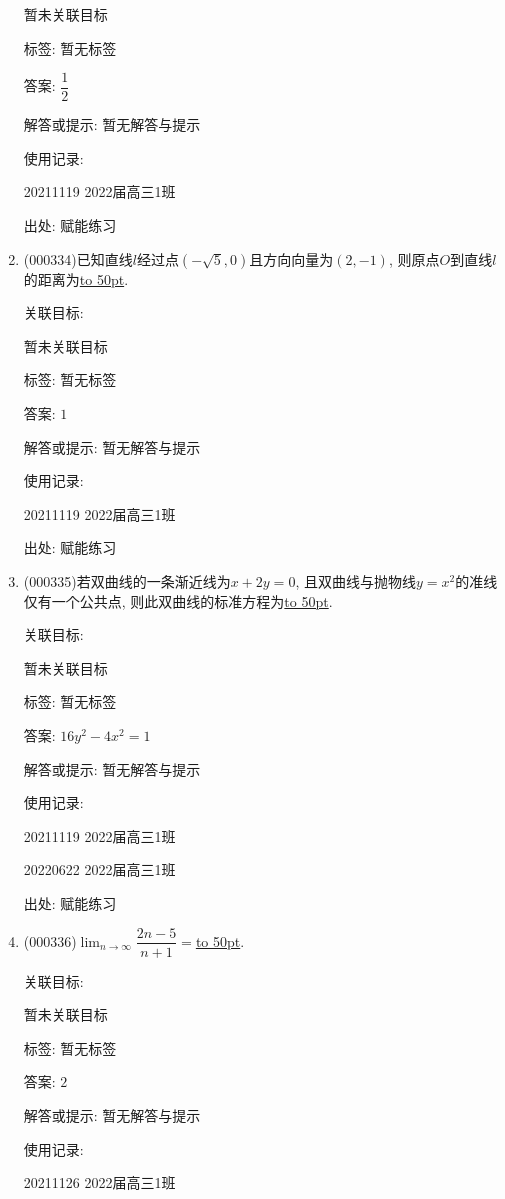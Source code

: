 \documentclass[10pt,a4paper]{article}
\newcommand{\blank}[1]{\underline{\hbox to #1pt{}}}
\begin{document}
\begin{enumerate}[1.]
暂未关联目标



标签: 暂无标签

答案: $\dfrac 12$

解答或提示: 暂无解答与提示

使用记录:

20211119	2022届高三1班	


出处: 赋能练习
\item { (000334)}已知直线$l$经过点$(-\sqrt{5},0)$且方向向量为$(2,-1)$, 则原点$O$到直线$l$的距离为\blank{50}.


关联目标:

暂未关联目标



标签: 暂无标签

答案: $1$

解答或提示: 暂无解答与提示

使用记录:

20211119	2022届高三1班	


出处: 赋能练习
\item { (000335)}若双曲线的一条渐近线为$x+2y=0$, 且双曲线与抛物线$y=x^2$的准线仅有一个公共点, 则此双曲线的标准方程为\blank{50}.


关联目标:

暂未关联目标



标签: 暂无标签

答案: $16y^2-4x^2=1$

解答或提示: 暂无解答与提示

使用记录:

20211119	2022届高三1班	

20220622	2022届高三1班  	


出处: 赋能练习
\item { (000336)}$\displaystyle\lim_{n\to \infty}\dfrac{2n-5}{n+1}=$\blank{50}.


关联目标:

暂未关联目标



标签: 暂无标签

答案: $2$

解答或提示: 暂无解答与提示

使用记录:

20211126	2022届高三1班	



\end{enumerate}
\end{document}
